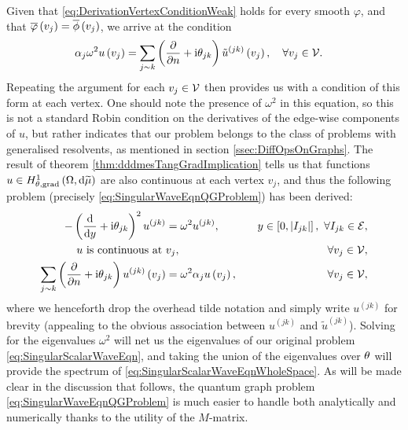 Given that \eqref{eq:DerivationVertexConditionWeak} holds for every smooth $\varphi$, and that $\overline{\varphi}\left( v_j \right)=\overline{\phi}\left( v_j \right)$, we arrive at the condition
\begin{align*}
	\alpha_j\omega^2 u\left( v_j \right) &= \sum_{j\sim k}\left( \dfrac{\partial }{\partial n} + \mathrm{i}\theta_{jk} \right)\tilde{u}^{(jk)}\left( v_j \right), \quad \forall v_j \in \mathcal{V}.
\end{align*}
Repeating the argument for each $v_j\in \mathcal{V}$ then provides us with a condition of this form at each vertex.
One should note the presence of $\omega^2$ in this equation, so this is not a standard Robin condition on the derivatives of the edge-wise components of $u$, but rather indicates that our problem belongs to the class of problems with generalised resolvents, as mentioned in section \ref{ssec:DiffOpsOnGraphs}.
The result of theorem \ref{thm:dddmesTangGradImplication} tells us that functions $u\in H^1_{\theta, \mathrm{grad}}\left( \Omega, \mathrm{d}\widetilde{\mu} \right)$ are also continuous at each vertex $v_j$, and thus the following problem (precisely \eqref{eq:SingularWaveEqnQGProblem}) has been derived:
\begin{subequations}
	\begin{align}
		-\left( \dfrac{\mathrm{d}}{\mathrm{d}y} + \mathrm{i}\theta_{jk} \right)^2 u^{(jk)} &= \omega^2 u^{(jk)}, \quad &y\in\left[ 0,\left\lvert I_{jk} \right\rvert \right], \ \forall I_{jk}\in\mathcal{E}, \\
		u \text{ is continuous at } & v_j, \quad &\forall v_j\in\mathcal{V},  \\
		\sum_{j\sim k}\left( \dfrac{\partial }{\partial n} + \mathrm{i}\theta_{jk} \right)u^{(jk)}\left( v_j \right) &= \omega^2\alpha_j u\left( v_j \right), \quad &\forall v_j\in\mathcal{V},
	\end{align}
\end{subequations}
where we henceforth drop the overhead tilde notation and simply write $u^{(jk)}$ for brevity (appealing to the obvious association between $u^{(jk)}$ and $\tilde{u}^{(jk)}$).
Solving for the eigenvalues $\omega^2$ will net us the eigenvalues of our original problem \eqref{eq:SingularScalarWaveEqn}, and taking the union of the eigenvalues over $\theta$ will provide the spectrum of \eqref{eq:SingularScalarWaveEqnWholeSpace}.
As will be made clear in the discussion that follows, the quantum graph problem \eqref{eq:SingularWaveEqnQGProblem} is much easier to handle both analytically and numerically thanks to the utility of the $M$-matrix.